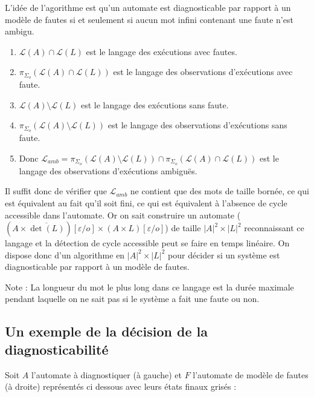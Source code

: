\documentclass[10pt,a4paper]{article}
\begin{document}
L'id\'ee de l'agorithme est qu'un automate est diagnosticable par rapport \`a un mod\`ele de fautes si et seulement si aucun mot infini contenant une faute n'est ambigu.

\begin{enumerate} 
  \item $\mathcal L (A) \cap \mathcal L(L)$ est le langage des ex\'ecutions avec fautes.
  \item $\pi_{\Sigma_o}(\mathcal L (A) \cap \mathcal L(L))$ est le langage des observations d'ex\'ecutions avec faute.
  \item $\mathcal L(A) \setminus \mathcal L(L)$ est le langage des ex\'ecutions sans faute.
  \item $\pi_{\Sigma_o}(\mathcal L(A) \setminus \mathcal L(L))$ est le langage des observations d'ex\'ecutions sans faute.
  \item Donc $ \mathcal L_{amb} = \pi_{\Sigma_o}(\mathcal L(A) \setminus \mathcal L(L)) \cap \pi_{\Sigma_o}(\mathcal L (A) \cap \mathcal L(L))$ est le langage des observations d'ex\'ecutions ambiguës.
\end{enumerate}
Il suffit donc de v\'erifier que $\mathcal L_{amb}$ ne contient que des mots de taille born\'ee, ce qui est équivalent au fait qu'il soit fini, ce qui est \'equivalent \`a l'absence de cycle accessible dans l'automate. Or on sait construire un automate ($(A\times \overline{\det(L)})[\varepsilon/o] \times (A\times L)[\varepsilon/o]$) de taille $|A|^2 \times |L|^2$ reconnaissant ce langage et la d\'etection de cycle accessible peut se faire en temps lin\'eaire. On dispose donc d'un algorithme en $|A|^2 \times |L|^2$ pour d\'ecider si un syst\`eme est diagnosticable par rapport \`a un mod\`ele de fautes.

Note : La longueur du mot le plus long dans ce langage est la dur\'ee maximale pendant laquelle on ne sait pas si le syst\`eme a fait une faute ou non.
\subsection{Un exemple de la d\'ecision de la diagnosticabilit\'e}

Soit $A$ l'automate \`a diagnostiquer (\`a gauche) et $F$ l'automate de mod\`ele de fautes  (\`a droite) repr\'esent\'es ci dessous avec leurs états finaux grisés :
\end{document}
